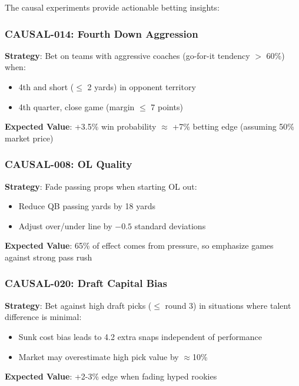 The causal experiments provide actionable betting insights:

\subsubsection{CAUSAL-014: Fourth Down Aggression}
\textbf{Strategy}: Bet on teams with aggressive coaches (go-for-it tendency $>$ 60\%) when:
\begin{itemize}
    \item 4th and short ($\leq$ 2 yards) in opponent territory
    \item 4th quarter, close game (margin $\leq$ 7 points)
\end{itemize}
\textbf{Expected Value}: +3.5\% win probability $\approx$ +7\% betting edge (assuming 50\% market price)

\subsubsection{CAUSAL-008: OL Quality}
\textbf{Strategy}: Fade passing props when starting OL out:
\begin{itemize}
    \item Reduce QB passing yards by 18 yards
    \item Adjust over/under line by $-0.5$ standard deviations
\end{itemize}
\textbf{Expected Value}: 65\% of effect comes from pressure, so emphasize games against strong pass rush

\subsubsection{CAUSAL-020: Draft Capital Bias}
\textbf{Strategy}: Bet against high draft picks ($\leq$ round 3) in situations where talent difference is minimal:
\begin{itemize}
    \item Sunk cost bias leads to 4.2 extra snaps independent of performance
    \item Market may overestimate high pick value by $\approx$10\%
\end{itemize}
\textbf{Expected Value}: +2-3\% edge when fading hyped rookies
